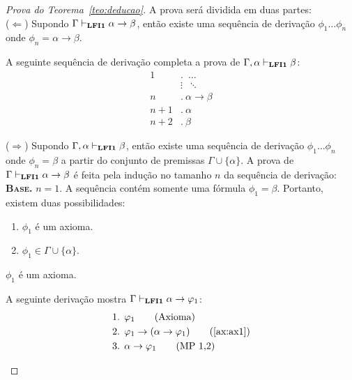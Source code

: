         \begin{proof}[Prova do Teorema~\ref{teo:deducao}] A prova será dividida em duas partes:\\
            ($\Longleftarrow$) Supondo $\Gamma \vdash_{{\normalfont\textbf{LFI1}}{}} \alpha \to \beta$, então existe uma sequência de derivação $\phi_{1} \ldots \phi_{n}$ onde $\phi_{n} = \alpha \to \beta$. 
            
            A seguinte sequência de derivação completa a prova de $\Gamma, \alpha \vdash_{{\normalfont\textbf{LFI1}}{}} \beta$:
            \begin{align*}
                \text{1}&.~ \; \ldots\\
                & \vdots \; ~\ddots\\
                \text{$n$}&.~ \alpha \to \beta\tag{Suposição}\\
                \text{$n + 1$}&.~ \alpha\tag{Premissa}\\
                \text{$n + 2$}&.~ \beta\tag{MP $n, n + 1$}
            \end{align*}

            \noindent  ($\Longrightarrow$) Supondo $\Gamma, \alpha \vdash_{{\normalfont\textbf{LFI1}}{}} \beta$, então existe uma sequência de derivação $\phi_{1} \ldots \phi_{n}$ onde $\phi_{n} = \beta$ a partir do conjunto de premissas $\Gamma \cup \{\alpha\}$. A prova de $\Gamma \vdash_{{\normalfont\textbf{LFI1}}{}} \alpha \to \beta$ é feita pela indução no tamanho $n$ da sequência de derivação:\\

            \noindent \textbf{\textsc{Base.}} $n = 1$.
            A sequência contém somente uma fórmula $\phi_{1} = \beta$. Portanto, existem duas possibilidades:
            \begin{enumerate}
                \item $\phi_{1}$ é um axioma.
                \item $\phi_{1} \in \Gamma \cup \{\alpha\}$.
            \end{enumerate}

            \begin{provaporcasos}
                \casodeprova{} $\phi_{1}$ é um axioma. 
                
                    A seguinte derivação mostra $\Gamma \vdash_{{\normalfont\textbf{LFI1}}{}} \alpha \to \varphi_{1}$:
                    \begin{align*}
                        & \text{1. } \phi_{1} \tag{Axioma}\\
                        & \text{2. } \phi_{1} \to (\alpha \to \phi_{1}) \tag{\ref{ax:ax1}}\\
                        & \text{3. } \alpha \to \phi_{1} \tag{MP 1,2}
                    \end{align*}


\end{provaporcasos}
\end{proof}

